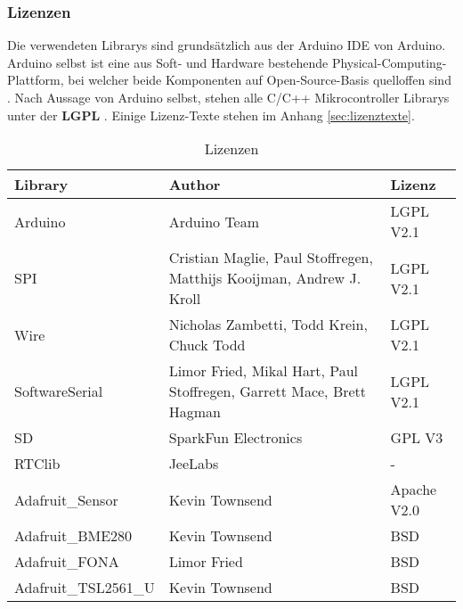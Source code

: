 \subsubsection{Lizenzen}
\label{subsubsec:lizenzen}

Die verwendeten Librarys sind grundsätzlich aus der Arduino IDE von Arduino. Arduino selbst ist eine aus Soft- und Hardware bestehende Physical-Computing-Plattform, bei welcher beide Komponenten auf Open-Source-Basis quelloffen sind \cite{arduinoWiki}. Nach Aussage von Arduino selbst, stehen alle C/C++ Mikrocontroller Librarys unter der \textbf{LGPL} \cite{ArduinoLicense2019}. Einige Lizenz-Texte stehen im Anhang \ref{sec:lizenztexte}. \\


\begin{table}[h]
\centering
\caption{Lizenzen}
\label{tab:lizenzen}
\begin{tabular}{|l|l|l|}
\hline 
\textbf{Library} & \textbf{Author} & \textbf{Lizenz} \\ 
\hline 
Arduino & Arduino Team & LGPL V2.1 \\ 
\hline 
SPI & Cristian Maglie, Paul Stoffregen, Matthijs Kooijman, Andrew J. Kroll & LGPL V2.1 \\ 
\hline 
Wire & Nicholas Zambetti, Todd Krein, Chuck Todd & LGPL V2.1 \\ 
\hline 
SoftwareSerial & Limor Fried, Mikal Hart, Paul Stoffregen, Garrett Mace, Brett Hagman & LGPL V2.1 \\ 
\hline 
SD & SparkFun Electronics & GPL V3 \\ 
\hline 
RTClib & JeeLabs & - \\ 
\hline 
Adafruit\_Sensor & Kevin Townsend & Apache V2.0 \\ 
\hline 
Adafruit\_BME280 & Kevin Townsend & BSD \\ 
\hline 
Adafruit\_FONA & Limor Fried & BSD \\ 
\hline 
Adafruit\_TSL2561\_U & Kevin Townsend & BSD \\ 
\hline 
\end{tabular} 
\end{table}
